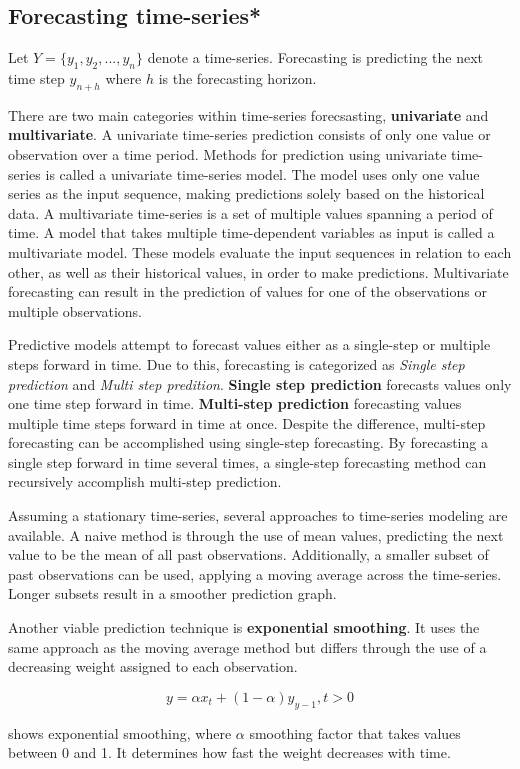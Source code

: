
\subsection{Forecasting time-series*}
\label{section:BT:forecasting-time-series}
Let  $Y = \{y_1, y_2, ..., y_n\}$ denote a time-series.
Forecasting is predicting the next time step $y_{n+h}$ where $h$ is the forecasting horizon.

There are two main categories within time-series forecsasting, \textbf{univariate} and \textbf{multivariate}.
A univariate time-series prediction consists of only one value or observation over a time period.
Methods for prediction using univariate time-series is called a univariate time-series model.
The model uses only one value series as the input sequence, making predictions solely based on the historical data.
A multivariate time-series is a set of multiple values spanning a period of time.
A model that takes multiple time-dependent variables as input is called a multivariate model.
These models evaluate the input sequences in relation to each other, as well as their historical values, in order to make predictions.
Multivariate forecasting can result in the prediction of values for one of the observations or multiple observations.

Predictive models attempt to forecast values either as a single-step or multiple steps forward in time.
Due to this, forecasting is categorized as \textit{Single step prediction} and \textit{Multi step predition}.
\textbf{Single step prediction} forecasts values only one time step forward in time.
\textbf{Multi-step prediction} forecasting values multiple time steps forward in time at once.
Despite the difference, multi-step forecasting can be accomplished using single-step forecasting.
By forecasting a single step forward in time several times, a single-step forecasting method can recursively accomplish multi-step prediction.


Assuming a stationary time-series, several approaches to time-series modeling are available.
A naive method is through the use of mean values, predicting the next value to be the mean of all past observations.
Additionally, a smaller subset of past observations can be used, applying a moving average across the time-series.
Longer subsets result in a smoother prediction graph.

Another viable prediction technique is \textbf{exponential smoothing}.
It uses the same approach as the moving average method but differs through the use of
a decreasing weight assigned to each observation.

\begin{equation}
  \label{eq:exponential_smoothing}
  y = \alpha x_t + (1 - \alpha)y_{y-1}, t > 0
\end{equation}

shows exponential smoothing, where $\alpha$ smoothing factor
that takes values between 0 and 1. It determines how fast the weight decreases with time.



